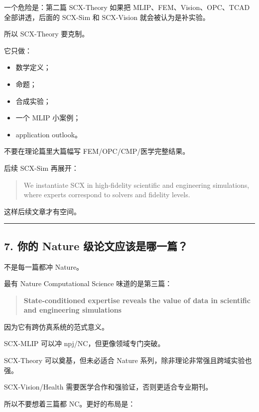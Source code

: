 \documentclass[
  12pt,
]{ctexart}
\providecommand{\tightlist}{%
  \setlength{\itemsep}{0pt}\setlength{\parskip}{0pt}}
\begin{document}
一个危险是：第二篇 SCX-Theory 如果把 MLIP、FEM、Vision、OPC、TCAD
全部讲透，后面的 SCX-Sim 和 SCX-Vision 就会被认为是补实验。

所以 SCX-Theory 要克制。

它只做：

\begin{itemize}
\tightlist
\item
  数学定义；
\item
  命题；
\item
  合成实验；
\item
  一个 MLIP 小案例；
\item
  application outlook。
\end{itemize}

不要在理论篇里大篇幅写 FEM/OPC/CMP/医学完整结果。

后续 SCX-Sim 再展开：

\begin{quote}
We instantiate SCX in high-fidelity scientific and engineering
simulations, where experts correspond to solvers and fidelity levels.
\end{quote}

这样后续文章才有空间。

\begin{center}\rule{0.5\linewidth}{0.5pt}\end{center}

\subsection{7. 你的 Nature
级论文应该是哪一篇？}\label{ux4f60ux7684-nature-ux7ea7ux8bbaux6587ux5e94ux8be5ux662fux54eaux4e00ux7bc7}

不是每一篇都冲 Nature。

最有 Nature Computational Science 味道的是第三篇：

\begin{quote}
\textbf{State-conditioned expertise reveals the value of data in
scientific and engineering simulations}
\end{quote}

因为它有跨仿真系统的范式意义。

SCX-MLIP 可以冲 npj/NC，但更像领域专门突破。

SCX-Theory 可以奠基，但未必适合 Nature
系列，除非理论非常强且跨域实验也强。

SCX-Vision/Health 需要医学合作和强验证，否则更适合专业期刊。

所以不要想着三篇都 NC。更好的布局是：
\end{document}
